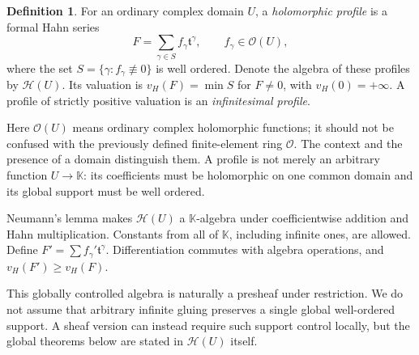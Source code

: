 \documentclass[11pt,a4paper]{article}
\numberwithin{equation}{section}
\theoremstyle{definition}
\newtheorem{definition}[theorem]{Definition}
\newcommand{\K}{\mathbb K}
\newcommand{\tmon}{\mathfrak t}
\newcommand{\OO}{\mathcal O}
\newcommand{\HH}{\mathscr H}
\newcommand{\vprof}{v_{\!H}}
\begin{document}
\begin{definition}\label{def:profile}
For an ordinary complex domain $U$, a \emph{holomorphic profile} is a formal
Hahn series
\begin{equation}\label{eq:profile}
 F=\sum_{\gamma\in S}f_\gamma\tmon^\gamma,
 \qquad f_\gamma\in\OO(U),
\end{equation}
where the set $S=\{\gamma:f_\gamma\not\equiv0\}$ is well ordered. Denote the
algebra of these profiles by $\HH(U)$. Its valuation is
$\vprof(F)=\min S$ for $F\neq0$, with $\vprof(0)=+\infty$. A profile of strictly positive valuation is
an \emph{infinitesimal profile}.
\end{definition}

Here $\OO(U)$ means ordinary complex holomorphic functions; it should not be
confused with the previously defined finite-element ring $\OO$. The context
and the presence of a domain distinguish them. A profile is not merely an
arbitrary function $U\to\K$: its coefficients must be holomorphic on one
common domain and its global support must be well ordered.

Neumann's lemma makes $\HH(U)$ a $\K$-algebra under coefficientwise addition
and Hahn multiplication. Constants from all of $\K$, including infinite ones,
are allowed. Define $F'=\sum f_\gamma'\tmon^\gamma$. Differentiation commutes
with algebra operations, and $\vprof(F')\geq\vprof(F)$.

This globally controlled algebra is naturally a presheaf under restriction.
We do not assume that arbitrary infinite gluing preserves a single global
well-ordered support. A sheaf version can instead require such support control
locally, but the global theorems below are stated in $\HH(U)$ itself.
\end{document}
